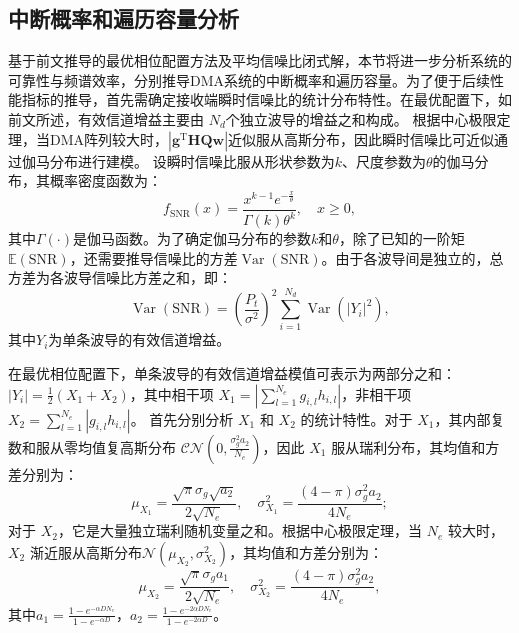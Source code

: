\subsection{中断概率和遍历容量分析}

基于前文推导的最优相位配置方法及平均信噪比闭式解，本节将进一步分析系统的可靠性与频谱效率，分别推导DMA系统的中断概率和遍历容量。为了便于后续性能指标的推导，首先需确定接收端瞬时信噪比的统计分布特性。在最优配置下，如前文所述，有效信道增益主要由 $N_d$个独立波导的增益之和构成。
根据中心极限定理，当DMA阵列较大时，$\left| \bm g^\mathrm{T} \bm H \bm Q \bm w \right|$近似服从高斯分布，因此瞬时信噪比可近似通过伽马分布进行建模。
设瞬时信噪比服从形状参数为$k$、尺度参数为$\theta$的伽马分布，其概率密度函数为：
\begin{equation}\label{eq:cdma_pdf_gamma}
	f_{\mathrm{SNR}}(x) = \frac{x^{k-1} e^{-\frac{x}{\theta}}}{\Gamma(k) \theta^k}, \quad x \geq 0,
\end{equation}
其中$\Gamma(\cdot)$是伽马函数。为了确定伽马分布的参数$k$和$\theta$，除了已知的一阶矩$\mathbb{E}(\mathrm{SNR})$，还需要推导信噪比的方差$\operatorname{Var}(\mathrm{SNR})$。由于各波导间是独立的，总方差为各波导信噪比方差之和，即：
\begin{equation}\label{eq:cdma_var_snr}
	\operatorname{Var}(\mathrm{SNR}) = \left(\frac{P_t}{\sigma^2}\right)^2 \sum_{i=1}^{N_d} \operatorname{Var}(|Y_i|^2),
\end{equation}
其中$Y_i$为单条波导的有效信道增益。


在最优相位配置下，单条波导的有效信道增益模值可表示为两部分之和：$|Y_i| = \frac{1}{2} (X_1 + X_2)$，其中相干项 $X_1 = \left| \sum_{l=1}^{N_e} g_{i,l} h_{i,l} \right|$，非相干项 $X_2 = \sum_{l=1}^{N_e} |g_{i,l} h_{i,l}|$。
首先分别分析 $X_1$ 和 $X_2$ 的统计特性。对于 $X_1$，其内部复数和服从零均值复高斯分布 $\mathcal{CN}\left(0, \frac{\sigma_g^2 a_2}{N_e}\right)$，因此 $X_1$ 服从瑞利分布，其均值和方差分别为：
\begin{equation}
	\mu_{X_1} = \frac{\sqrt{\pi} \sigma_g \sqrt{a_2}}{2 \sqrt{N_e}}, \quad \sigma_{X_1}^2 = \frac{(4-\pi)\sigma_g^2 a_2}{4 N_e};
\end{equation}
对于 $X_2$，它是大量独立瑞利随机变量之和。根据中心极限定理，当 $N_e$ 较大时，$X_2$ 渐近服从高斯分布$\mathcal{N}(\mu_{X_2}, \sigma_{X_2}^2)$，其均值和方差分别为：
\begin{equation}
	\mu_{X_2} = \frac{\sqrt{\pi} \sigma_g a_1}{2 \sqrt{N_e}}, \quad \sigma_{X_2}^2 = \frac{(4-\pi)\sigma_g^2 a_2}{4 N_e},
\end{equation}
其中$a_1 = \frac{1 - e^{-\alpha D N_e}}{1 - e^{-\alpha D}}$，$a_2 = \frac{1 - e^{-2\alpha D N_e}}{1 - e^{-2\alpha D}}$。

